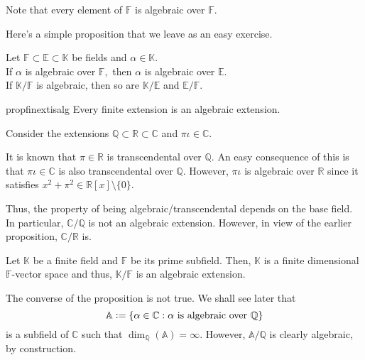 \begin{ex}
    Note that every element of $\mathbb{F}$ is algebraic over $\mathbb{F}.$
\end{ex}

Here's a simple proposition that we leave as an easy exercise.

\begin{prop} \label{prop:decompalgisalg}
    Let $\mathbb{F} \subset \mathbb{E} \subset \mathbb{K}$ be fields and $\alpha \in \mathbb{K}.$ \\
    If $\alpha$ is algebraic over $\mathbb{F},$ then $\alpha$ is algebraic over $\mathbb{E}.$ \\
    If $\mathbb{K}/\mathbb{F}$ is algebraic, then so are $\mathbb{K}/\mathbb{E}$ and $\mathbb{E}/\mathbb{F}.$
\end{prop}

\begin{restatable}[]{prop}{finextisalg}
\label{prop:finextisalg}
    Every finite extension is an algebraic extension. \hfill\hyperref[prop:finextisalg2]{\downsym}
\end{restatable}


\begin{ex}
    Consider the extensions $\mathbb{Q} \subset \mathbb{R} \subset \mathbb{C}$ and $\pi\iota \in \mathbb{C}.$

    It is known that $\pi \in \mathbb{R}$ is transcendental over $\mathbb{Q}.$ An easy consequence of this is that $\pi\iota \in \mathbb{C}$ is also transcendental over $\mathbb{Q}.$ However, $\pi\iota$ is algebraic over $\mathbb{R}$ since it satisfies $x^2 + \pi^2 \in \mathbb{R}[x] \setminus \{0\}.$

    Thus, the property of being algebraic/transcendental depends on the base field. In particular, $\mathbb{C}/\mathbb{Q}$ is not an algebraic extension. However, in view of the earlier proposition, $\mathbb{C}/\mathbb{R}$ is.
\end{ex}

\begin{ex}
    Let $\mathbb{K}$ be a finite field and $\mathbb{F}$ be its prime subfield. Then, $\mathbb{K}$ is a finite dimensional $\mathbb{F}$-vector space and thus, $\mathbb{K}/\mathbb{F}$ is an algebraic extension.
\end{ex}

\begin{rem}
    The converse of the proposition is not true. We shall see later that
    \begin{equation*} 
        \mathbb{A} \vcentcolon= \{\alpha \in \mathbb{C} : \alpha \text{ is algebraic over }\mathbb{Q}\}
    \end{equation*}
    is a subfield of $\mathbb{C}$ such that $\dim_{\mathbb{Q}}(\mathbb{A}) = \infty.$ However, $\mathbb{A}/\mathbb{Q}$ is clearly algebraic, by construction.
\end{rem}

